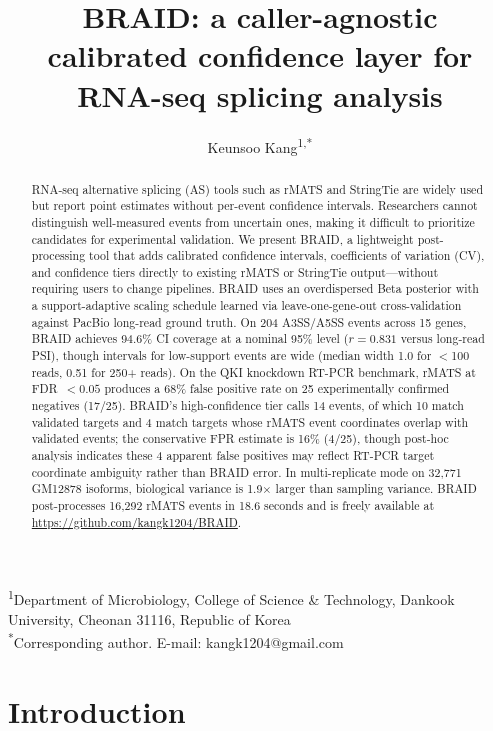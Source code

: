 \documentclass[10pt]{article}
\title{BRAID: a caller-agnostic calibrated confidence layer for RNA-seq splicing analysis}
\author{Keunsoo Kang\textsuperscript{1,*}}
\date{}
\begin{document}
\maketitle

\noindent\textsuperscript{1}Department of Microbiology, College of Science \& Technology, Dankook University, Cheonan 31116, Republic of Korea\\[2pt]
\textsuperscript{*}Corresponding author. E-mail: kangk1204@gmail.com

\begin{abstract}
RNA-seq alternative splicing (AS) tools such as rMATS and StringTie are widely used but report point estimates without per-event confidence intervals.
Researchers cannot distinguish well-measured events from uncertain ones, making it difficult to prioritize candidates for experimental validation.
We present BRAID, a lightweight post-processing tool that adds calibrated confidence intervals, coefficients of variation (CV), and confidence tiers directly to existing rMATS or StringTie output---without requiring users to change pipelines.
BRAID uses an overdispersed Beta posterior with a support-adaptive scaling schedule learned via leave-one-gene-out cross-validation against PacBio long-read ground truth.
On 204 A3SS/A5SS events across 15 genes, BRAID achieves 94.6\% CI coverage at a nominal 95\% level ($r = 0.831$ versus long-read PSI), though intervals for low-support events are wide (median width 1.0 for $<$100 reads, 0.51 for 250+ reads).
On the QKI knockdown RT-PCR benchmark, rMATS at FDR~$< 0.05$ produces a 68\% false positive rate on 25 experimentally confirmed negatives (17/25).
BRAID's high-confidence tier calls 14 events, of which 10 match validated targets and 4 match targets whose rMATS event coordinates overlap with validated events; the conservative FPR estimate is 16\% (4/25), though post-hoc analysis indicates these 4 apparent false positives may reflect RT-PCR target coordinate ambiguity rather than BRAID error.
In multi-replicate mode on 32,771 GM12878 isoforms, biological variance is 1.9$\times$ larger than sampling variance.
BRAID post-processes 16,292 rMATS events in 18.6 seconds and is freely available at \url{https://github.com/kangk1204/BRAID}.
\end{abstract}

\section*{Introduction}
\end{document}
